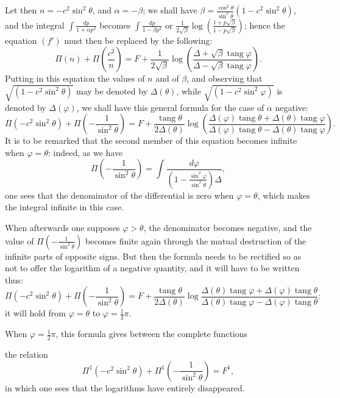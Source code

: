 \documentclass{article}
\begin{document}
Let then $n=-c^{2}\sin^{2}\theta$, and $\alpha=-\beta$; we shall have $\beta=\frac{\cos^{2}\theta}{\sin^{2}\theta}(1-c^{2}\sin^{2}\theta)$, and the integral $\displaystyle\int\frac{dp}{1+\alpha p^{2}}$ becomes $\displaystyle\int\frac{dp}{1-\beta p^{2}}$ or $\frac{1}{2\sqrt{\beta}}\log\left(\frac{1+p\sqrt{\beta}}{1-p\sqrt{\beta}}\right)$; hence the equation $(f')$ must then be replaced by the following:
\[ \Pi(n)+\Pi\left(\frac{c^{2}}{n}\right)=F+\frac{1}{2\sqrt{\beta}}\log\left(\frac{\Delta+\sqrt{\beta}\operatorname{tang}\varphi}{\Delta-\sqrt{\beta}\operatorname{tang}\varphi}\right). \]
Putting in this equation the values of $n$ and of $\beta$, and observing that $\sqrt{(1-c^{2}\sin^{2}\theta)}$ may be denoted by $\Delta(\theta)$, while $\sqrt{(1-c^{2}\sin^{2}\varphi)}$ is denoted by $\Delta(\varphi)$, we shall have this general formula for the case of $\alpha$ negative:
\[ \Pi(-c^{2}\sin^{2}\theta)+\Pi\left(-\frac{1}{\sin^{2}\theta}\right)=F+\frac{\operatorname{tang}\theta}{2\Delta(\theta)}\log\left(\frac{\Delta(\varphi)\operatorname{tang}\theta+\Delta(\theta)\operatorname{tang}\varphi}{\Delta(\varphi)\operatorname{tang}\theta-\Delta(\theta)\operatorname{tang}\varphi}\right). \]
It is to be remarked that the second member of this equation becomes infinite when $\varphi=\theta$: indeed, as we have
\[ \Pi\left(-\frac{1}{\sin^{2}\theta}\right)=\int\frac{d\varphi}{\left(1-\frac{\sin^{2}\varphi}{\sin^{2}\theta}\right)\Delta}, \]
one sees that the denominator of the differential is zero when $\varphi=\theta$, which makes the integral infinite in this case.

When afterwards one supposes $\varphi>\theta$, the denominator becomes negative, and the value of $\Pi\left(-\frac{1}{\sin^{2}\theta}\right)$ becomes finite again through the mutual destruction of the infinite parts of opposite signs. But then the formula needs to be rectified so as not to offer the logarithm of a negative quantity, and it will have to be written thus:
\[ \Pi(-c^{2}\sin^{2}\theta)+\Pi\left(-\frac{1}{\sin^{2}\theta}\right)=F+\frac{\operatorname{tang}\theta}{2\Delta(\theta)}\log\frac{\Delta(\theta)\operatorname{tang}\varphi+\Delta(\varphi)\operatorname{tang}\theta}{\Delta(\theta)\operatorname{tang}\varphi-\Delta(\varphi)\operatorname{tang}\theta}: \]
it will hold from $\varphi=\theta$ to $\varphi=\frac{1}{2}\pi$.

When $\varphi=\frac{1}{2}\pi$, this formula gives between the complete functions

the relation
\[ \Pi^{1}(-c^{2}\sin^{2}\theta)+\Pi^{1}\left(-\frac{1}{\sin^{2}\theta}\right)=F^{1}, \]
in which one sees that the logarithms have entirely disappeared.
\end{document}
